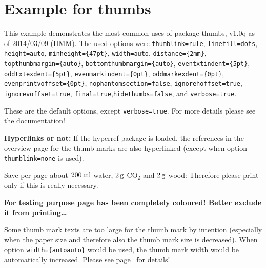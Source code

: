 \documentclass[twoside,british]{article}[2007/10/19]%
\gdef\unit#1{\mathord{\thinspace\mathrm{#1}}}
\begin{document}
\section*{Example for thumbs}

This example demonstrates the most common uses of package
\textsf{thumbs}, v1.0q as of 2014/03/09 (HMM).
The used options were \texttt{thumblink=rule}, \texttt{linefill=dots},
\texttt{height=auto}, \texttt{minheight=\{47pt\}}, \texttt{width={auto}},
\texttt{distance=\{2mm\}}, \newline
\texttt{topthumbmargin=\{auto\}}, \texttt{bottomthumbmargin=\{auto\}}, \newline
\texttt{eventxtindent=\{5pt\}}, \texttt{oddtxtexdent=\{5pt\}},
\texttt{evenmarkindent=\{0pt\}}, \texttt{oddmarkexdent=\{0pt\}},
\texttt{evenprintvoffset=\{0pt\}},
\texttt{nophantomsection=false},
\texttt{ignorehoffset=true}, \texttt{ignorevoffset=true}, \newline
\texttt{final=true},\texttt{hidethumbs=false}, and \texttt{verbose=true}.

\noindent These are the default options, except \texttt{verbose=true}.
For more details please see the documentation!\newline

\textbf{Hyperlinks or not:} If the \textsf{hyperref} package is loaded,
the references in the overview page for the thumb marks are also hyperlinked
(except when option \texttt{thumblink=none} is used).\newline

\bigskip

{\color{teal} Save per page about $200\unit{ml}$ water, $2\unit{g}$ CO$_{2}$
and $2\unit{g}$ wood:\newline
Therefore please print only if this is really necessary.}\newline

\bigskip

\textbf{%
For testing purpose page \pageref{greenpage} has been completely coloured!
\newline
Better exclude it from printing\ldots \newline}

\bigskip

Some thumb mark texts are too large for the thumb mark by intention
(especially when the paper size and therefore also the thumb mark size
is decreased). When option \texttt{width=\{autoauto\}} would be used,
the thumb mark width would be automatically increased.
Please see page~\pageref{HugeText} for details!
\end{document}

